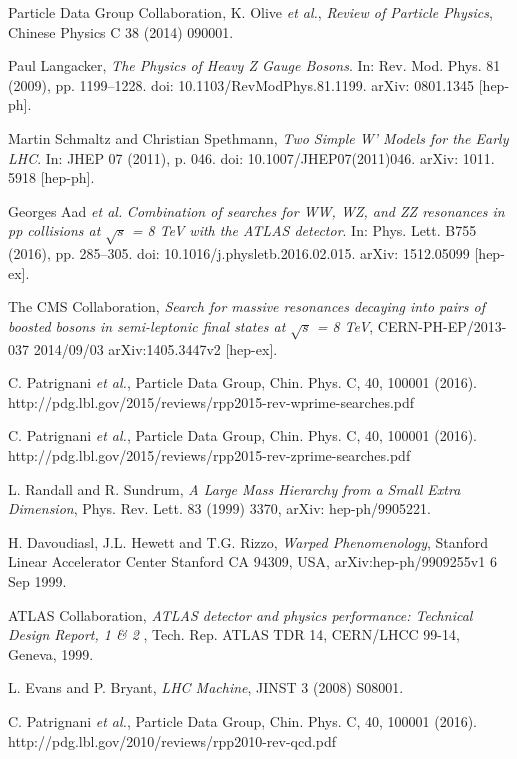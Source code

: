 \documentclass[UKenglish,texlive=2013]{\ATLASLATEXPATH atlasdoc}
\newcommand{\cme}{\sqrt{s}}
\begin{document}
\begin{thebibliography}{9}

  Particle Data Group Collaboration, K. Olive \emph{et al.},
  \emph{ Review of Particle Physics},
Chinese Physics C 38 (2014) 090001.

Paul Langacker,
\emph{The Physics of Heavy
Z Gauge Bosons}. In: Rev. Mod. Phys.
81 (2009), pp. 1199–1228. doi: 10.1103/RevModPhys.81.1199. arXiv: 0801.1345
[hep-ph].

Martin Schmaltz and Christian Spethmann,
\emph{Two Simple W’ Models for the Early
LHC}. In: JHEP 07 (2011), p. 046. doi: 10.1007/JHEP07(2011)046. arXiv: 1011.
5918 [hep-ph].

Georges Aad \emph{et al.}
\emph{Combination of searches for WW, WZ, and ZZ resonances
in pp collisions at $\sqrt{s}$ = 8 TeV with the ATLAS detector}. In: Phys. Lett. B755
(2016), pp. 285–305. doi: 10.1016/j.physletb.2016.02.015. arXiv: 1512.05099
[hep-ex].

The CMS Collaboration,
\emph{Search for massive resonances decaying into pairs of boosted bosons in semi-leptonic final states at $\cme$ = 8 TeV},
CERN-PH-EP/2013-037
2014/09/03
arXiv:1405.3447v2 [hep-ex].

C. Patrignani \emph{et al.},
Particle Data Group, Chin. Phys. C, 40, 100001 (2016).
http://pdg.lbl.gov/2015/reviews/rpp2015-rev-wprime-searches.pdf

C. Patrignani \emph{et al.},
Particle Data Group, Chin. Phys. C, 40, 100001 (2016).
http://pdg.lbl.gov/2015/reviews/rpp2015-rev-zprime-searches.pdf

L. Randall and R. Sundrum,
\emph{A Large Mass Hierarchy from a Small Extra Dimension},
Phys. Rev. Lett. 83 (1999) 3370, arXiv: hep-ph/9905221.

H. Davoudiasl, J.L. Hewett and T.G. Rizzo,
\emph{Warped Phenomenology},
Stanford Linear Accelerator Center
Stanford CA 94309, USA,
arXiv:hep-ph/9909255v1 6 Sep 1999.

  ATLAS Collaboration,
  \emph{ATLAS detector and physics performance: Technical Design Report, 1 \& 2} ,
  Tech. Rep. ATLAS TDR 14, CERN/LHCC 99-14, Geneva, 1999.

L. Evans and P. Bryant,
\emph{LHC Machine}, JINST 3 (2008) S08001.

C. Patrignani \emph{et al.},
Particle Data Group, Chin. Phys. C, 40, 100001 (2016).
http://pdg.lbl.gov/2010/reviews/rpp2010-rev-qcd.pdf


\end{thebibliography}
\end{document}
